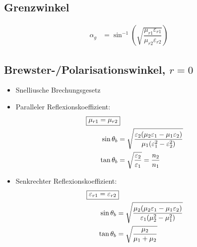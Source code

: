 \subsection{Grenzwinkel}
\begin{align*}
    \alpha_g & = \sin^{-1} \left( \sqrt{ \dfrac{\mu_{r1} \varepsilon_{r1}}{\mu_{r2} \varepsilon_{r2}}} \right)
\end{align*}
\subsection[Brewster-/Polarisationswinkel]{Brewster-/Polarisationswinkel, $r=0$}
\begin{itemize}
    \item Snelliusche Brechungsgesetz
    \item Paralleler Reflexionskoeffizient:
          \begin{align*}
              \Aboxed{\mu_{r1}=\mu_{r2}}                                                                                                    \\
              \sin\theta_b & = \sqrt{\frac{\varepsilon_2(\mu_2\varepsilon_1 - \mu_1\varepsilon_2)}{\mu_1(\varepsilon_1^2-\varepsilon_2^2)}} \\
              \tan\theta_b & = \sqrt{\frac{\varepsilon_2}{\varepsilon_1}} = \frac{n_2}{n_1}
          \end{align*}

    \item Senkrechter Reflexionskoeffizient:
          \begin{align*}
              \Aboxed{\varepsilon_{r1}=\varepsilon_{r2}}                                                                    \\
              \sin\theta_b & = \sqrt{\frac{\mu_2(\mu_2\varepsilon_1 - \mu_1\varepsilon_2)}{\varepsilon_1(\mu_2^2-\mu_1^2)}} \\
              \tan\theta_b & = \sqrt{\frac{\mu_2}{\mu_1+\mu_2}}
          \end{align*}
\end{itemize}

